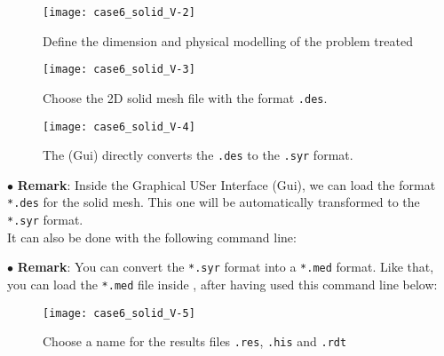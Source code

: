 \begin{figure}[h!]
\begin{center}
\texttt{[image: case6\_solid\_V-2]}
\caption{Define the dimension and physical modelling of the problem treated}
\label{fig1_e5}
\end{center}
\end{figure}

\begin{figure}[h!]
\begin{center}
\texttt{[image: case6\_solid\_V-3]}
\caption{Choose the 2D solid mesh file with the format \texttt{.des}.}
\label{fig1_e5}
\end{center}
\end{figure}
\newpage

\begin{figure}[h!]
\begin{center}
\texttt{[image: case6\_solid\_V-4]}
\caption{The \syrthes (Gui) directly converts the \texttt{.des} to the \texttt{.syr} format.}
\label{fig1_e5}
\end{center}
\end{figure}

$\bullet$ {\bf Remark}: Inside the \syrthes Graphical USer Interface (Gui), we can load the \simail
format \texttt{*.des} for the solid mesh. This one will be automatically transformed to the \texttt{*.syr} format.\\
It can also be done with the following command line:\\

$\bullet$ {\bf Remark}: You can convert the \texttt{*.syr} format into a \texttt{*.med} format.
Like that, you can load the \texttt{*.med} file inside \salome, after having used this command line below:\\

\begin{figure}[h!]
\begin{center}
\texttt{[image: case6\_solid\_V-5]}
\caption{Choose a name for the results files \texttt{.res}, \texttt{.his} and \texttt{.rdt}}
\label{fig1_e5}
\end{center}
\end{figure}
\newpage

